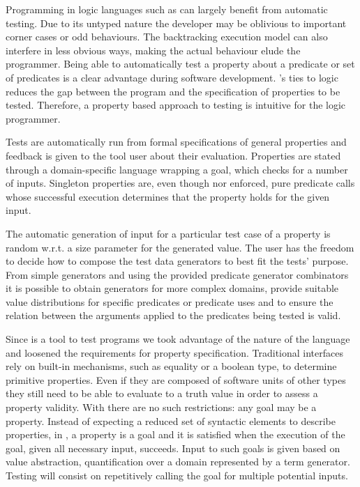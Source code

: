 Programming in logic languages such as \Prolog{} can largely benefit
from automatic testing.
%
Due to its untyped nature the developer may be oblivious to important
corner cases or odd behaviours.
%
The backtracking execution model can also interfere in less obvious
ways, making the actual behaviour elude the programmer.
%
Being able to automatically test a property about a predicate or set of
predicates is a clear advantage during software development.
%
\Prolog{}'s ties to logic reduces the gap between the program and the
specification of properties to be tested.
%
Therefore, a property based approach to testing is intuitive for the
logic programmer.  


Tests are automatically run from formal specifications of general
properties and feedback is given to the tool user about their
evaluation.
%
Properties are stated through a domain-specific language wrapping a
\Prolog{} goal, which \plqc{} checks for a number of inputs.
%
Singleton properties are, even though nor enforced, pure predicate calls
whose successful execution determines that the property holds for the
given input.


The automatic generation of input for a particular test case of a
property is random w.r.t. a size parameter for the generated value.
%
The user has the freedom to decide how to compose the test data
generators to best fit the tests' purpose.
%
From simple generators and using the provided predicate generator
combinators it is possible to obtain generators for more complex
domains, provide suitable value distributions for specific predicates or
predicate uses and to ensure the relation between the arguments applied
to the predicates being tested is valid.


Since \plqc{} is a tool to test \Prolog{} programs we took advantage of
the nature of the language and loosened the requirements for property
specification.
%
Traditional interfaces rely on built-in mechanisms, such as equality or
a boolean type, to determine primitive properties.
%
Even if they are composed of software units of other types they still
need to be able to evaluate to a truth value in order to assess a
property validity.
%
With \Prolog{} there are no such restrictions: any goal may be a property.
%
Instead of expecting a reduced set of syntactic elements to describe
properties, in \plqc{}, a property is a goal and it is satisfied when
the execution of the goal, given all necessary input, succeeds.
%
Input to such goals is given based on \plqc{} value abstraction,
quantification over a domain represented by a term generator.
%
Testing will consist on repetitively calling the goal for multiple
potential inputs.


